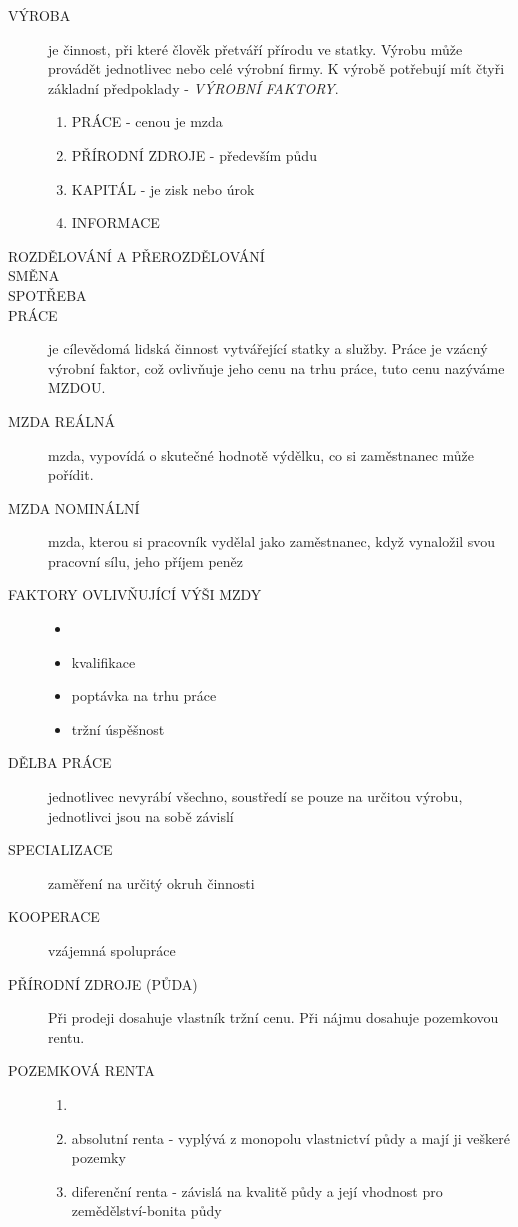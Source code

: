 \documentclass[12pt,a4paper,twoside]{book}
\begin{document}
\begin{description}
	\item[VÝROBA] je činnost, při které člověk přetváří přírodu ve statky. Výrobu může provádět jednotlivec nebo celé výrobní firmy. \newline K výrobě potřebují mít čtyři základní předpoklady - \emph{VÝROBNÍ FAKTORY}.
		\begin{enumerate}
			\item PRÁCE - cenou je mzda
			\item PŘÍRODNÍ ZDROJE - především půdu
			\item KAPITÁL - je zisk nebo úrok
			\item INFORMACE
		\end{enumerate}		
	\item[ROZDĚLOVÁNÍ A PŘEROZDĚLOVÁNÍ]
	\item[SMĚNA]
	\item[SPOTŘEBA]
	\item[PRÁCE] je cílevědomá lidská činnost vytvářející statky a služby. Práce je vzácný výrobní faktor, což ovlivňuje jeho cenu na trhu práce, tuto cenu nazýváme MZDOU.
	\item[MZDA REÁLNÁ] mzda, vypovídá o skutečné hodnotě výdělku, co si zaměstnanec může pořídit.
	\item[MZDA NOMINÁLNÍ] mzda, kterou si pracovník vydělal jako zaměstnanec, když vynaložil svou pracovní sílu, jeho příjem peněz
	\item[FAKTORY OVLIVŇUJÍCÍ VÝŠI MZDY]
		\begin{itemize}
			\item[]
			\item kvalifikace
			\item poptávka na trhu práce
			\item tržní úspěšnost
		\end{itemize}
	\item[DĚLBA PRÁCE] jednotlivec nevyrábí všechno, soustředí se pouze na určitou výrobu, jednotlivci jsou na sobě závislí
	\item[SPECIALIZACE] zaměření na určitý okruh činnosti
	\item[KOOPERACE] vzájemná spolupráce
	\item[PŘÍRODNÍ ZDROJE (PŮDA)] Při prodeji dosahuje vlastník tržní cenu. Při nájmu dosahuje pozemkovou rentu.
	\item[POZEMKOVÁ RENTA]
		\begin{enumerate}[label=(\alph*)]
			\item[]
			\item absolutní renta - vyplývá z monopolu vlastnictví půdy a mají ji veškeré pozemky
			\item diferenční renta - závislá na kvalitě půdy a její vhodnost pro zemědělství-bonita půdy
		\end{enumerate}


\end{description}
\end{document}
